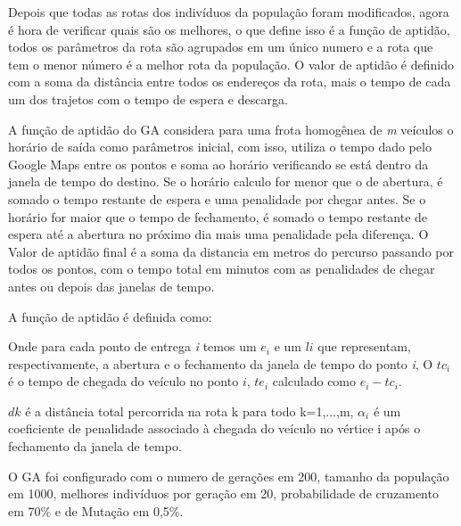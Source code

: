 Depois que todas as rotas dos indivíduos da população foram modificados, agora é hora de verificar quais são os melhores, o que define isso é a função de aptidão, todos os parâmetros da rota são agrupados em um único numero e a rota que tem o menor número é a melhor rota da população. O valor de aptidão é definido com a soma da distância entre todos os endereços da rota, mais o tempo de cada um dos trajetos com o tempo de espera e descarga.

A função de aptidão do GA considera para uma frota homogênea de \textit{m} veículos o horário de saída como parâmetros inicial, com isso, utiliza o tempo dado pelo Google Maps entre os pontos e soma ao horário verificando se está dentro da janela de tempo do destino. Se o horário calculo for menor que o de abertura, é somado o tempo restante de espera e uma penalidade por chegar antes. Se o horário for maior que o tempo de fechamento, é somado o tempo restante de espera até a abertura no próximo dia mais uma penalidade pela diferença. O Valor de aptidão final é a soma da distancia em metros do percurso passando por todos os pontos, com o tempo total em minutos com as penalidades de chegar antes ou depois das janelas de tempo.

A função de aptidão é definida como:

\begin{center}
	\label{fig:MetodoAptidao}
\end{center}

Onde para cada ponto de entrega \textit{i} temos um \(e_i\)
e um \(li\)  que representam, respectivamente, a abertura e o fechamento
da janela de tempo do ponto \textit{i}, O \(tc_i\) é o tempo de chegada do veículo no ponto \(i\), \(te_i\) calculado como \(e_i - tc_i\). 

\(dk\) é a distância total percorrida na rota k para todo k=1,...,m, \(\alpha_i\)
é um coeficiente de penalidade associado à chegada do veículo no vértice i após o fechamento da janela de tempo.

O GA foi configurado com o numero de gerações em 200, tamanho da população em 1000, melhores indivíduos por geração em 20, probabilidade de cruzamento em 70\% e de Mutação em 0,5\%.

